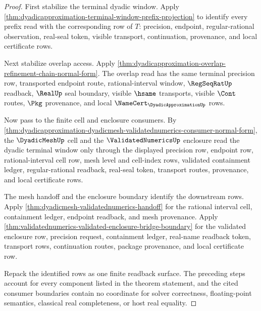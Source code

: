 \begin{proof}
First stabilize the terminal dyadic window. Apply
\autoref{thm:dyadicapproximation-terminal-window-prefix-projection} to identify
every prefix read with the corresponding row of $T$: precision, endpoint,
regular-rational observation, real-seal token, visible transport, continuation,
provenance, and local certificate rows.

Next stabilize overlap access. Apply
\autoref{thm:dyadicapproximation-overlap-refinement-chain-normal-form}. The
overlap read has the same terminal precision row, transported endpoint route,
rational-interval window, $\RegSeqRatUp$ readback, $\RealUp$ seal boundary,
visible $\hsame$ transports, visible $\Cont$ routes, $\Pkg$ provenance, and
local $\NameCert_{\DyadicApproximationUp}$ rows.

Now pass to the finite cell and enclosure consumers. By
\autoref{thm:dyadicapproximation-dyadicmesh-validatednumerics-consumer-normal-form},
the $\DyadicMeshUp$ cell and the $\ValidatedNumericsUp$ enclosure read the
dyadic terminal window only through the displayed precision row, endpoint row,
rational-interval cell row, mesh level and cell-index rows, validated
containment ledger, regular-rational readback, real-seal token, transport
routes, provenance, and local certificate rows.

The mesh handoff and the enclosure boundary identify the downstream rows.
Apply \autoref{thm:dyadicmesh-validatednumerics-handoff} for the rational
interval cell, containment ledger, endpoint readback, and mesh provenance.
Apply \autoref{thm:validatednumerics-validated-enclosure-bridge-boundary} for
the validated enclosure row, precision request, containment ledger, real-name
readback token, transport rows, continuation routes, package provenance, and
local certificate row.

Repack the identified rows as one finite readback surface. The preceding
steps account for every component listed in the theorem statement, and the
cited consumer boundaries contain no coordinate for solver correctness,
floating-point semantics, classical real completeness, or host real equality.
\end{proof}
